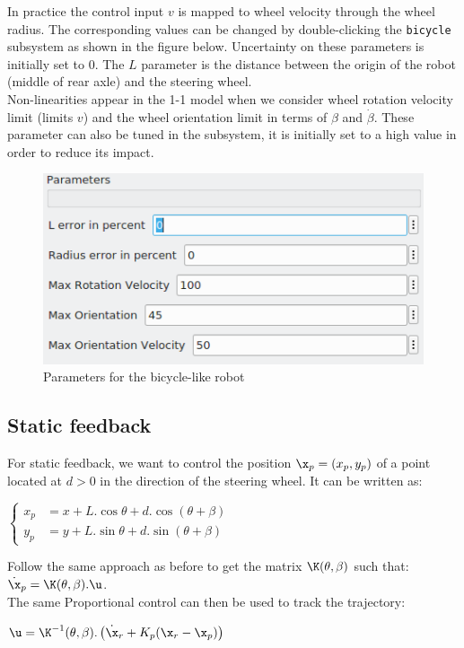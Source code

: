 \documentclass{ecnreport}
\begin{document}
In practice the control input $v$ is mapped to wheel velocity through the wheel radius. The corresponding values can be changed by double-clicking the \texttt{bicycle} subsystem as shown in the figure below. Uncertainty on these parameters is initially set to 0. The $L$ parameter is the distance between the origin of the robot (middle of rear axle) and the steering wheel.  \\

Non-linearities appear in the 1-1 model when we consider wheel rotation velocity limit (limits $v$) and the wheel orientation limit in terms of $\beta$ and $\dot \beta$. These parameter can also be tuned in the subsystem, it is initially set to a high value in order to reduce its impact.

\begin{figure}[ht]
\centering
\includegraphics[width=0.4\linewidth]{param11}
\caption{Parameters for the bicycle-like robot}
\end{figure}

\subsection{Static feedback}

For static feedback, we want to control the position $\x_p = (x_p,y_p)$ of a point located at $d > 0$ in the direction of the steering wheel.
It can be written as: 
\begin{center}
 $\left\{\begin{array}{ll}
         x_p &= x + L.\cos\theta + d.\cos(\theta+\beta) \\
         y_p &= y + L.\sin\theta  + d.\sin(\theta+\beta)
        \end{array}\right.$
\end{center}
Follow the same approach as before to get the matrix $\K(\theta, \beta)$ such that: $\dot \x_p = \K(\theta, \beta).\u$.
\\

The same Proportional control can then be used to track the trajectory:
\begin{center}
$\u = \K^{-1}(\theta, \beta) .\left(\dot \x_r + K_p(\x_r - \x_p)\right)$
\end{center}
\end{document}
